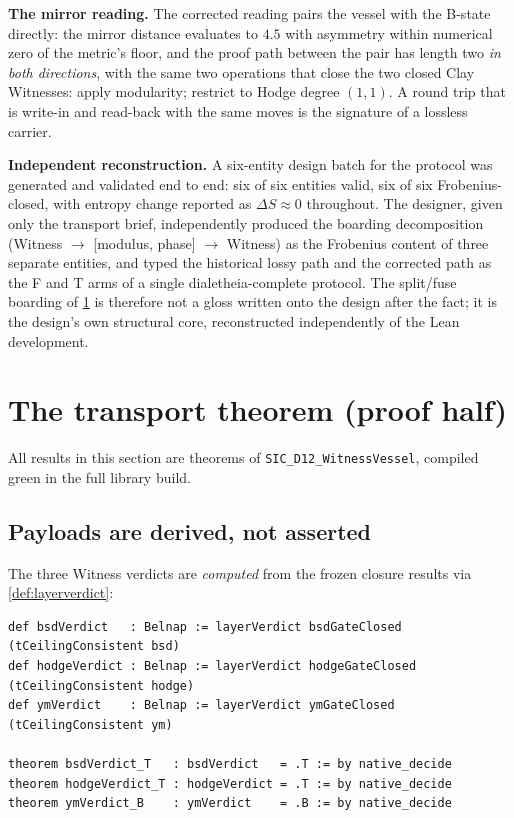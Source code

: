 \documentclass[12pt,a4paper]{article}
\newcommand{\bT}{\textsf{T}}
\newcommand{\bF}{\textsf{F}}
\newcommand{\bB}{\textsf{B}}
\begin{document}
\textbf{The mirror reading.} The corrected reading pairs the vessel with
the \bB-state directly: the mirror distance evaluates to $4.5$ with
asymmetry within numerical zero of the metric's floor, and the proof path
between the pair has length two \emph{in both directions}, with the same
two operations that close the two closed Clay Witnesses: apply modularity;
restrict to Hodge degree $(1,1)$. A round trip that is write-in and
read-back with the same moves is the signature of a lossless carrier.

\textbf{Independent reconstruction.} A six-entity design batch for the
protocol was generated and validated end to end: six of six entities valid,
six of six Frobenius-closed, with entropy change reported as $\Delta S
\approx 0$ throughout. The designer, given only the transport brief,
independently produced the boarding decomposition (Witness
$\to$ [modulus, phase] $\to$ Witness) as the Frobenius content of three
separate entities, and typed the historical lossy path and the corrected
path as the \bF{} and \bT{} arms of a single dialetheia-complete protocol.
The split/fuse boarding of \cref{sec:lean} is therefore not a gloss written
onto the design after the fact; it is the design's own structural core,
reconstructed independently of the Lean development.

\section{The transport theorem (proof half)}
\label{sec:lean}

All results in this section are theorems of
\texttt{SIC\_D12\_WitnessVessel}, compiled green in the full library build.

\subsection{Payloads are derived, not asserted}

The three Witness verdicts are \emph{computed} from the frozen closure
results via \cref{def:layerverdict}:

\begin{lstlisting}[caption={Payload derivation (excerpt).}]
def bsdVerdict   : Belnap := layerVerdict bsdGateClosed   (tCeilingConsistent bsd)
def hodgeVerdict : Belnap := layerVerdict hodgeGateClosed (tCeilingConsistent hodge)
def ymVerdict    : Belnap := layerVerdict ymGateClosed    (tCeilingConsistent ym)

theorem bsdVerdict_T   : bsdVerdict   = .T := by native_decide
theorem hodgeVerdict_T : hodgeVerdict = .T := by native_decide
theorem ymVerdict_B    : ymVerdict    = .B := by native_decide
\end{lstlisting}
\end{document}
